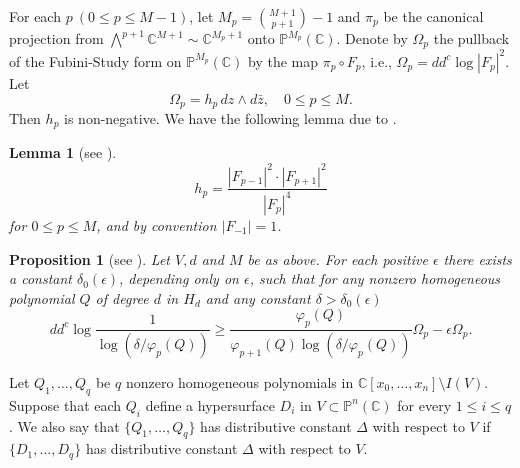 \documentclass[12pt]{amsart}
\newtheorem{lemma}[theorem]{Lemma}
\newtheorem{proposition}[theorem]{Proposition}
\newcommand{\C}{{\mathbb{C}}}
\renewcommand{\P}{{\mathbb{P}}}
\begin{document}
For each $p\ (0\le p\le M-1)$, let $M_p=\binom{M+1}{p+1}-1$ and $\pi_p$ be the canonical projection from $\bigwedge^{p+1}\C^{M+1}\sim\C^{M_p+1}$ onto $\P^{M_p}(\C)$. Denote by $\Omega_p$ the pullback of the Fubini-Study form on $\P^{M_p}(\C)$ by the map $\pi_p\circ F_{p}$, i.e., $\Omega_p = dd^c\log |F_{p}|^2$. Let
$$\Omega_p = h_p \, dz \wedge d\bar{z}, \quad 0 \le p \le M.$$
Then $h_p$ is non-negative. We have the following lemma due to \cite{Ru01}.  
\begin{lemma}[{see \cite[Lemma 4.1]{Ru01}}]\label{3.2}
$$h_p = \frac{|F_{p-1}|^2 \cdot |F_{p+1}|^2}{|F_p|^4}$$
for $0 \le p \le M$, and by convention $|F_{-1}| = 1$.
\end{lemma}

\begin{proposition}[{see \cite[Proposition 2.5.1]{Fu93}}]\label{3.3}
Let $V,d$ and $M$ be as above. For each positive $\epsilon$ there exists a constant $\delta_0(\epsilon)$, depending only on $\epsilon$, such that for any nonzero homogeneous polynomial $Q$ of degree $d$ in $H_d$ and any constant $\delta>\delta_0(\epsilon)$
$$ dd^c\log\dfrac{1}{\log(\delta/\varphi_{p}(Q))}\ge\dfrac{\varphi_{p}(Q)}{\varphi_{p+1}(Q)\log(\delta/\varphi_{p}(Q))}\Omega_p-\epsilon\Omega_p.$$
\end{proposition}
% 
Let $Q_1,\ldots,Q_q$ be $q$ nonzero homogeneous polynomials in $\C[x_0,\ldots,x_n]\setminus I(V).$ Suppose that each $Q_i$ define a hypersurface $D_i$ in $V\subset\P^n(\C)$ for every $1\le i\le q$. We also say that $\{Q_1,\ldots,Q_q\}$ has distributive constant $\Delta$ with respect to $V$ if $\{D_1,\ldots,D_q\}$ has distributive constant $\Delta$ with respect to $V$.
\end{document}

